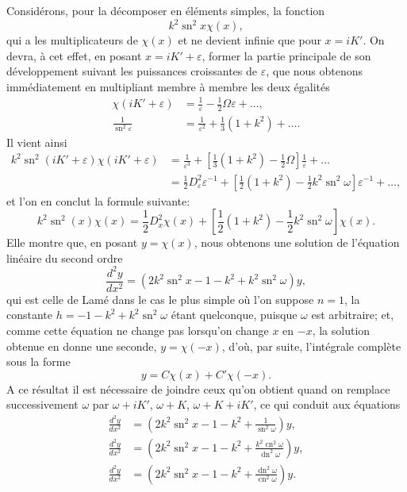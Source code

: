 \documentclass[11pt,leqno,oneside,letterpaper]{book}[2005/09/16]
\DeclareMathOperator{\sn}{sn}
\DeclareMathOperator{\cn}{cn}
\DeclareMathOperator{\dn}{dn}
\begin{document}
Consid\'erons, pour la d\'ecomposer en \'el\'ements simples, la fonction %
\[
k^2\sn^2 x\chi(x),
\]
qui a les multiplicateurs de $\chi(x)$ et ne devient infinie que pour $x = iK'$. On devra, \`a cet effet, en posant $x = iK' + \varepsilon$, former la
partie principale de son d\'eveloppement suivant les puissances croissantes
de $\varepsilon$, que nous obtenons imm\'ediatement en multipliant membre \`a membre
les deux \'egalit\'es
\begin{align*}
\chi(iK' + \varepsilon) & =
\frac{1}{\varepsilon} - \frac{1}{2} \Omega \varepsilon + \ldots, \\
\frac{1}{\sn^2 \varepsilon} & =
\frac{1}{\varepsilon^2} + \frac{1}{3} \left(1 + k^2\right) + \ldots.
\end{align*}
Il vient ainsi
\begin{align*}
k^2 \sn^2 (iK' + \varepsilon) \chi (iK' + \varepsilon) & =
\frac{1}{\varepsilon^3} + \left[\frac{1}{3}\left(1+k^{2}\right) - \frac{1}{2} \Omega \right] \frac{1}{\varepsilon} + \ldots \\
& = \frac{1}{2} D^2_{\varepsilon} \varepsilon^{-1} + \left[\frac{1}{2}\left( 1+k^2 \right) - \frac{1}{2} k^2 \sn^2 \omega \right] \varepsilon^{-1} + \ldots,
\end{align*}
et l'on en conclut la formule suivante:
\[
k^2 \sn^2 (x) \chi (x) = \frac{1}{2} D^2_x \chi (x) + \left[\frac{1}{2}\left( 1+k^2 \right) - \frac{1}{2} k^2 \sn^2 \omega \right] \chi (x).
\]
Elle montre que, en posant $y = \chi (x)$, nous obtenons une solution de
l'\'equa\-tion lin\'eaire du second ordre\label{page14}
\[
\frac{d^2 y}{dx^2} = \left(2k^2 \sn^2 x - 1 - k^2 + k^2 \sn^2 \omega \right)y,
\]
qui est celle de Lam\'e dans le cas le plus simple o\`u l'on suppose $n = 1$, la
constante $h = -1-k^2 + k^2 \sn^2 \omega$ \'etant quelconque, puisque $\omega$ est arbitraire;
et, comme cette \'equation ne change pas lorsqu'on change $x$ en
$-x$, la solution obtenue en donne une seconde, $y = \chi(-x)$, d'o\`u, par
suite, l'int\'egrale compl\`ete sous la forme
\[
y = C \chi(x) + C' \chi(-x).
\]
A ce r\'esultat il est n\'ecessaire de joindre ceux qu'on obtient quand on remplace
successivement $\omega$ par $\omega + iK'$, $\omega + K$, $\omega + K + iK'$, ce qui conduit
aux \'equations
\begin{align*}
\frac{d^2 y}{dx^2} & =  \left( 2k^2 \sn^2 x - 1 - k^2 + \frac{1}{\sn^2 \omega} \right) y, \\
\frac{d^2 y}{dx^2} & =  \left( 2k^2 \sn^2 x - 1 - k^2 + \frac{k^2 \cn^2 \omega}{\dn^2 \omega} \right) y, \\
\frac{d^2 y}{dx^2} & =  \left( 2k^2 \sn^2 x - 1 - k^2 + \frac{\dn^2 \omega}{\cn^2 \omega} \right) y.
\end{align*}
\end{document}
